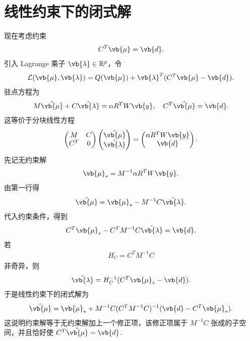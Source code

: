 \section{线性约束下的闭式解}

现在考虑约束
\begin{align*}
	C^T\vb{\mu}=\vb{d}.
\end{align*}
引入 Lagrange 乘子 \(\vb{\lambda}\in\mathbb{R}^p\)，令
\begin{align*}
	\mathcal{L}(\vb{\mu},\vb{\lambda})
	=Q(\vb{\mu})+\vb{\lambda}^T(C^T\vb{\mu}-\vb{d}).
\end{align*}
驻点方程为
\begin{align*}
	M\hat{\vb{\mu}}+C\hat{\vb{\lambda}}
	=\alpha R^TW\vb{y},
	\quad
	C^T\hat{\vb{\mu}}=\vb{d}.
\end{align*}
这等价于分块线性方程
\begin{align*}
	\begin{pmatrix}
		M & C\\
		C^T & 0
	\end{pmatrix}
	\begin{pmatrix}
		\hat{\vb{\mu}}\\
		\hat{\vb{\lambda}}
	\end{pmatrix}
	=
	\begin{pmatrix}
		\alpha R^TW\vb{y}\\
		\vb{d}
	\end{pmatrix}.
\end{align*}
先记无约束解
\begin{align*}
	\vb{\mu}_*=
	M^{-1}\alpha R^TW\vb{y}.
\end{align*}
由第一行得
\begin{align*}
	\hat{\vb{\mu}}
	=\vb{\mu}_*-M^{-1}C\hat{\vb{\lambda}}.
\end{align*}
代入约束条件，得到
\begin{align*}
	C^T\vb{\mu}_*-C^TM^{-1}C\hat{\vb{\lambda}}=\vb{d}.
\end{align*}
若
\begin{align*}
	H_C=C^TM^{-1}C
\end{align*}
非奇异，则
\begin{align*}
	\hat{\vb{\lambda}}
	=H_C^{-1}(C^T\vb{\mu}_*-\vb{d}).
\end{align*}
于是线性约束下的闭式解为
\begin{align*}
	\hat{\vb{\mu}}
	=\vb{\mu}_*
	+M^{-1}C(C^TM^{-1}C)^{-1}
	(\vb{d}-C^T\vb{\mu}_*).
\end{align*}
这说明约束解等于无约束解加上一个修正项，该修正项属于 \(M^{-1}C\) 张成的子空间，并且恰好使 \(C^T\hat{\vb{\mu}}=\vb{d}\).

